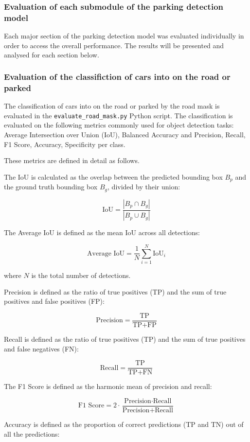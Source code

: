 \subsubsection{Evaluation of each submodule of the parking detection model}
Each major section of the parking detection model was evaluated individually in order to access the overall performance. The results will be presented and analysed for each section below.

\subsubsection{Evaluation of the classifiction of cars into on the road or parked}
The classification of cars into on the road or parked by the road mask is evaluated in the \texttt{evaluate\_road\_mask.py} Python script.
The classification is evaluated on the following metrics commonly used for object detection tasks: Average Intersection over Union (IoU), Balanced Accuracy and Precision, Recall, F1 Score, Accuracy, Specificity per class.

These metrics are defined in detail as follows.

The IoU is calculated as the overlap between the predicted bounding box \( B_p \) and the ground truth bounding box \( B_g \), divided by their union:

\[
\text{IoU} = \frac{|B_p \cap B_g|}{|B_p \cup B_g|}
\]

The Average IoU is defined as the mean IoU across all detections:

\[
\text{Average IoU} = \frac{1}{N} \sum_{i=1}^{N} \text{IoU}_i
\]

where \( N \) is the total number of detections.

Precision is defined as the ratio of true positives (TP) and the sum of true positives and false positives (FP):

\[
\text{Precision} = \frac{\text{TP}}{\text{TP} + \text{FP}}
\]

Recall is defined as the ratio of true positives (TP) and the sum of true positives and false negatives (FN):

\[
\text{Recall} = \frac{\text{TP}}{\text{TP} + \text{FN}}
\]

The F1 Score is defined as the harmonic mean of precision and recall:

\[
\text{F1 Score} = 2 \cdot \frac{\text{Precision} \cdot \text{Recall}}{\text{Precision} + \text{Recall}}
\]

Accuracy is defined as the proportion of correct predictions (TP and TN) out of all the predictions:

